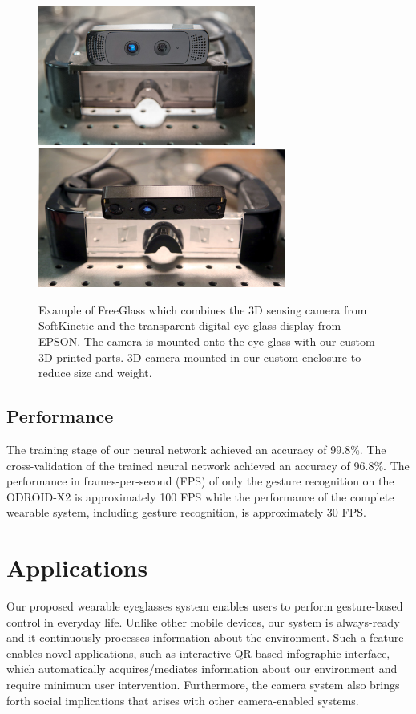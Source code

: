 \begin{figure}
\centering
\includegraphics[height=1.8in]{ch5/figs/wearable/low_res/eyetap_mann_glass.jpg}
\includegraphics[height=1.8in]{ch5/figs/wearable/low_res/eyetap_slim_IMG_2408.jpg}
\caption{Example of FreeGlass which combines the 3D sensing camera from SoftKinetic
and the transparent digital eye glass display from EPSON. The camera is mounted onto the eye glass with our custom 3D printed parts. 3D camera mounted in our custom enclosure to reduce size and weight. }
\label{fig:3Dcamera_head}
\end{figure}

\subsection{Performance}
The training stage of our neural network achieved an accuracy of 99.8\%. The cross-validation of the trained neural network achieved an accuracy of 96.8\%. The performance in frames-per-second (FPS) of only the gesture recognition on the ODROID-X2 is approximately 100 FPS while the performance of the complete wearable system, including gesture recognition, is approximately 30 FPS.

\section{Applications}
Our proposed wearable eyeglasses system enables users to perform gesture-based control in everyday life. Unlike other mobile devices, our system is always-ready and it continuously processes information about the environment. Such a feature enables novel applications, such as interactive QR-based infographic interface, which automatically acquires/mediates information about our environment and require minimum user intervention. Furthermore, the camera system also brings forth social implications that arises with other camera-enabled systems.

